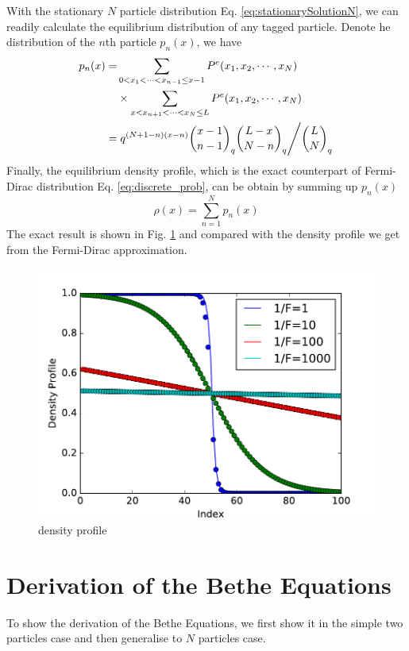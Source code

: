 \documentclass[aps,showpacs,twocolumn,floatfix,prx,superscriptaddress]{revtex4-1}
\begin{document}
With the stationary $N$ particle distribution Eq. \eqref{eq:stationarySolutionN}, we can readily calculate the equilibrium distribution of any tagged particle. Denote he distribution of the $n$th particle $p_n(x)$, we have
\begin{equation}
    \begin{aligned}
        \label{eq:pdfTaggedParticle}
        p_n(x) = & \sum_{0<x_1<\cdots<x_{n-1}\le x-1}P^e(x_1, x_2, \cdots, x_N) \\
        &\times \sum_{x<x_{n+1}<\cdots<x_{N}\le L}P^e(x_1, x_2, \cdots, x_N) \\
        = & \left. q^{(N+1-n)(x-n)} \binom{x-1}{n-1}_q\binom{L-x}{N-n}_q 
            \middle/  \binom{L}{N}_q \right.
    \end{aligned}
\end{equation}
Finally, the equilibrium density profile, which is the exact counterpart of Fermi-Dirac distribution Eq. \eqref{eq:discrete_prob}, can be obtain by summing up $p_n(x)$
\begin{equation}
    \label{eq:densityProfile}
    \rho(x) = \sum_{n=1}^N p_n(x) 
\end{equation}
The exact result is shown in Fig. \ref{fig:densityN100} and compared with the density profile we get from the Fermi-Dirac approximation. 
\begin{figure}[htpb]
    \centering
    \includegraphics[width=1.0\linewidth]{densityN100}
    \caption{density profile}
    \label{fig:densityN100}
\end{figure}


\section{Derivation of the Bethe Equations}
\label{sec:derivation_of_bethe_equations}
To show the derivation of the Bethe Equations, we first show it in the simple two particles case and then generalise to $N$ particles case.
\end{document}
